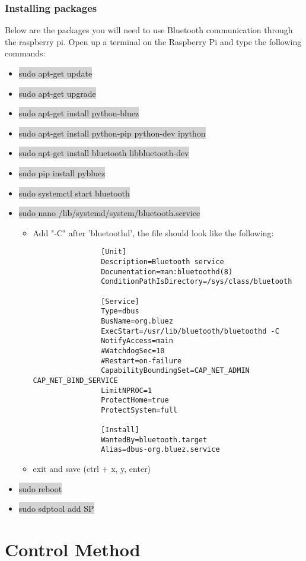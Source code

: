 \documentclass[12pt]{article}
\begin{document}
\subsubsection{Installing packages}
Below are the packages you will need to use Bluetooth communication through the raspberry pi. Open up a terminal on the Raspberry Pi  and type the following commands:
\begin{itemize}
	\item[] \colorbox{lightgray}{sudo apt-get update}
	\item[] \colorbox{lightgray}{sudo apt-get upgrade}
	\item[] \colorbox{lightgray}{sudo apt-get install python-bluez}
	\item[] \colorbox{lightgray}{sudo apt-get install python-pip python-dev ipython}
	\item[] \colorbox{lightgray}{sudo apt-get install bluetooth libbluetooth-dev}
	\item[] \colorbox{lightgray}{sudo pip install pybluez}
	\item[] \colorbox{lightgray}{sudo systemctl start bluetooth}
	\item[] \colorbox{lightgray}{sudo nano /lib/systemd/system/bluetooth.service}
		\begin{itemize}
			\item Add "-C" after 'bluetoothd', the file should look like the following:
			\begin{verbatim}
				[Unit]
				Description=Bluetooth service
				Documentation=man:bluetoothd(8)
				ConditionPathIsDirectory=/sys/class/bluetooth
				
				[Service]
				Type=dbus
				BusName=org.bluez
				ExecStart=/usr/lib/bluetooth/bluetoothd -C
				NotifyAccess=main
				#WatchdogSec=10
				#Restart=on-failure
				CapabilityBoundingSet=CAP_NET_ADMIN CAP_NET_BIND_SERVICE
				LimitNPROC=1
				ProtectHome=true
				ProtectSystem=full
				
				[Install]
				WantedBy=bluetooth.target
				Alias=dbus-org.bluez.service
			\end{verbatim}
			\item exit and save (ctrl + x, y, enter)
		\end{itemize}
	\item[] \colorbox{lightgray}{sudo reboot}
	\item[] \colorbox{lightgray}{sudo sdptool add SP}
\end{itemize}

\section{Control Method}
\end{document}
